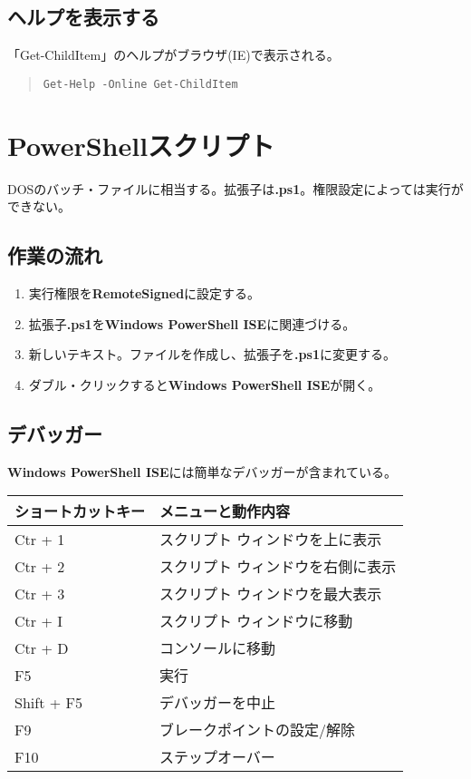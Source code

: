 \documentclass[dvipdfmx]{jsarticle}
\begin{document}
\subsection{ヘルプを表示する}

「Get-ChildItem」のヘルプがブラウザ(IE)で表示される。

\begin{quote}
\begin{verbatim}
Get-Help -Online Get-ChildItem
\end{verbatim}
\end{quote}


\section{PowerShellスクリプト}
DOSのバッチ・ファイルに相当する。拡張子は\textbf{.ps1}。権限設定によっては実行ができない。


\subsection{作業の流れ}

\begin{enumerate}
\item 実行権限を\textbf{RemoteSigned}に設定する。
\item 拡張子\textbf{.ps1}を\textbf{Windows PowerShell ISE}に関連づける。
\item 新しいテキスト。ファイルを作成し、拡張子を\textbf{.ps1}に変更する。
\item ダブル・クリックすると\textbf{Windows PowerShell ISE}が開く。

\end{enumerate}

\subsection{デバッガー}
\textbf{Windows PowerShell ISE}には簡単なデバッガーが含まれている。

\hspace{3mm}

\begin{tabular}{ll}
ショートカットキー & メニューと動作内容 \\
\hline
Ctr + 1 & スクリプト ウィンドウを上に表示 \\
Ctr + 2 & スクリプト ウィンドウを右側に表示 \\
Ctr + 3 & スクリプト ウィンドウを最大表示 \\
Ctr + I & スクリプト ウィンドウに移動 \\
Ctr + D & コンソールに移動 \\
F5 & 実行 \\
Shift + F5 & デバッガーを中止 \\
F9 & ブレークポイントの設定/解除 \\
F10 & ステップオーバー \\
\end{tabular}
\end{document}

